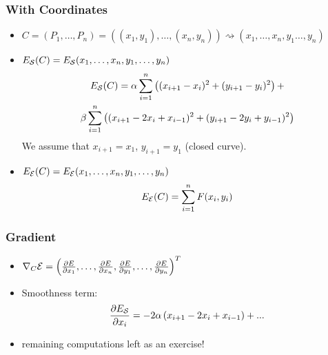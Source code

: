 \documentclass[10pt]{beamer}
\newcommand{\myemph}[1]{{\color{blue}{#1}}}
\begin{document}
\begin{frame}
  \frametitle{With Coordinates}
  \begin{itemize}
  \item $C = (P_1,\dots,P_n) = ((x_1,y_1),\dots,(x_n,y_n)) \rightsquigarrow (x_1,\dots,x_n,y_1\dots,y_n)$
  \item $E_{\mathcal S}(C) = E_{\mathcal S}(x_1,\dots,x_n,y_1, \dots,y_n)$
    \begin{multline*}
      E_{\mathcal S}(C) = \alpha\sum_{i=1}^n\left((x_{i+1}-x_i)^2 + (y_{i+1}-y_i)^2\right)+\\
      \beta\sum_{i=1}^n\left((x_{i+1}-2 x_i + x_{i-1})^2 + (y_{i+1}-2 y_i + y_{i-1})^2\right)
    \end{multline*}
    We assume that $x_{i+1} = x_1$, $y_{i+1} = y_1$ (closed curve).
  \item $E_{\mathcal E}(C) = E_{\mathcal E}(x_1,\dots,x_n,y_1, \dots,y_n)$
    $$
    E_{\mathcal E}(C) = \sum_{i=1}^n F(x_i,y_i)
    $$
\end{itemize}
\end{frame}

\begin{frame}
  \frametitle{Gradient}
  \begin{itemize}
  \item $\nabla_C {\mathcal E} = \left(\frac{\partial{E}}{\partial{x_1}},\dots,\frac{\partial{E}}{\partial{x_n}},\frac{\partial{E}}{\partial{y_1}},\dots,\frac{\partial{E}}{\partial{y_n}}\right)^T$
  \item Smoothness term:
    $$
    \frac{\partial{E_{\mathcal S}}}{\partial{x_i}} = -2\alpha\left(x_{i+1}-2x_i+x_{i-1}\right) + ...
    $$
  \item remaining computations left as an exercise!
  \end{itemize}
\end{frame}


\end{document}
